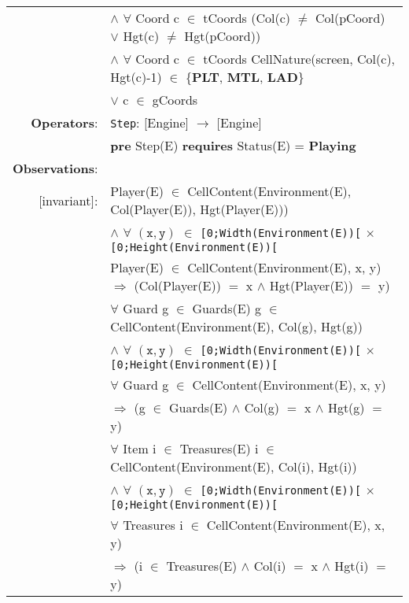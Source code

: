 \documentclass[8pt]{article}
\begin{document}
{\begin{longtable}{rl}
  & \quad\quad\quad $\land$ $\forall$ \textrm{Coord} c $\in$ tCoords (\textrm{Col(c)} $\neq$ \textrm{Col(pCoord)} $\lor$ \textrm{Hgt(c)} $\neq$ \textrm{Hgt(pCoord)})\\
  & \quad\quad\quad $\land$ $\forall$ \textrm{Coord} c $\in$ tCoords \textrm{CellNature(screen, Col(c), Hgt(c)-1)} $\in$ \{\textbf{PLT}, \textbf{MTL}, \textbf{LAD}\} \\
  & \quad\quad\quad\quad\quad $\lor$ c $\in$ gCoords \\
  \textbf{Operators}: &\texttt{Step}: \textrm{[Engine]} $\rightarrow$ \textrm{[Engine]} \\
  & \quad \textbf{pre} \textrm{Step(E)} \textbf{requires} \textrm{Status(E)} = \textbf{Playing}\\
  \textbf{Observations}:&\\
  \textrm{[invariant]}:& \textrm{Player(E)} $\in$ \textrm{CellContent(Environment(E), Col(Player(E)), Hgt(Player(E)))}\\
  & \quad\quad $\land$ $\forall$ $(\mathtt{x},\mathtt{y})$ $\in$ \texttt{[0;Width(Environment(E))[} $\times$ \texttt{[0;Height(Environment(E))[}\\
  & \quad\quad\quad\quad \textrm{Player(E)} $\in$ \textrm{CellContent(Environment(E), x, y)} $\Rightarrow$ (\textrm{Col(Player(E))} $=$ x $\land$ \textrm{Hgt(Player(E))} $=$ y)\\
  & $\forall$ \textrm{Guard} g $\in$ \textrm{Guards(E)} g $\in$ \textrm{CellContent(Environment(E), Col(g), Hgt(g))}\\
  & \quad\quad $\land$ $\forall$ $(\mathtt{x},\mathtt{y})$ $\in$ \texttt{[0;Width(Environment(E))[} $\times$ \texttt{[0;Height(Environment(E))[}\\
  & \quad\quad\quad\quad $\forall$ \textrm{Guard} g $\in$ \textrm{CellContent(Environment(E), x, y)} \\
  & \quad\quad\quad\quad\quad\quad $\Rightarrow$ (g $\in$ \textrm{Guards(E)} $\land$ \textrm{Col(g)} $=$ x $\land$ \textrm{Hgt(g)} $=$ y)\\
  & $\forall$ \textrm{Item} i $\in$ \textrm{Treasures(E)} i $\in$ \textrm{CellContent(Environment(E), Col(i), Hgt(i))}\\
  & \quad\quad $\land$ $\forall$ $(\mathtt{x},\mathtt{y})$ $\in$ \texttt{[0;Width(Environment(E))[} $\times$ \texttt{[0;Height(Environment(E))[}\\
  & \quad\quad\quad\quad $\forall$ \textrm{Treasures} i $\in$ \textrm{CellContent(Environment(E), x, y)} \\
  & \quad\quad\quad\quad\quad\quad $\Rightarrow$ (i $\in$ \textrm{Treasures(E)} $\land$ \textrm{Col(i)} $=$ x $\land$ \textrm{Hgt(i)} $=$ y)\\

\end{longtable}}
\end{document}
